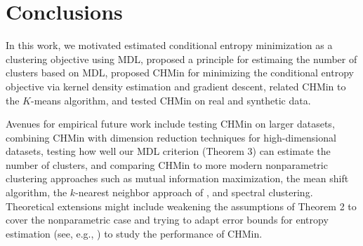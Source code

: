 \documentclass{article} %
\begin{document}
\section{Conclusions}
In this work, we motivated estimated conditional entropy minimization as a
clustering objective using MDL, proposed a principle for estimaing the number
of clusters based on MDL, proposed CHMin for minimizing the conditional entropy
objective via kernel density estimation and gradient descent, related
CHMin to the $K$-means algorithm, and tested CHMin on real and synthetic data.

Avenues for empirical future work include testing CHMin on larger datasets,
combining CHMin with dimension reduction techniques for high-dimensional
datasets, testing how well our MDL criterion (Theorem 3) can estimate the
number of clusters, and comparing CHMin to more modern nonparametric clustering
approaches such as mutual information maximization, the mean shift algorithm,
the $k$-nearest neighbor approach of \cite{steeg2013demystifying}, and spectral
clustering. Theoretical extensions might include weakening the assumptions of
Theorem 2 to cover the nonparametric case and trying to adapt error bounds
for entropy estimation (see, e.g., \cite{singh14densityfunc}) to study the
performance of CHMin.



\end{document}
